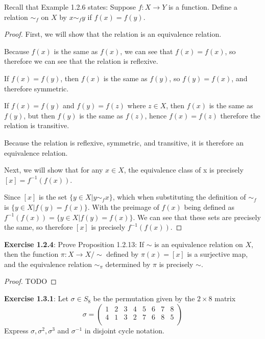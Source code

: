 \documentclass[a4paper]{article}
\begin{document}
\begin{myparindent}{0pt}
Recall that Example 1.2.6 states: Suppose $f : X \rightarrow Y$ is a function.
Define a relation $\sim_f$ on $X$ by $x \sim_f y$ if $f(x) = f(y)$.

\begin{proof}
    First, we will show that the relation is an equivalence relation. \newline

    Because $f(x)$ is the same as $f(x)$, we can see that $f(x) = f(x)$,
    so therefore we can see that the relation is reflexive. \newline

    If $f(x) = f(y)$, then $f(x)$ is the same as $f(y)$, so $f(y) = f(x)$,
    and therefore symmetric. \newline

    If $f(x) = f(y)$ and $f(y) = f(z)$ where $z \in X$, then $f(x)$ is
    the same as $f(y)$, but then $f(y)$ is the same as $f(z)$, hence $f(x) = f(z)$
    therefore the relation is transitive. \newline

    Because the relation is reflexive, symmetric, and transitive, it
    is therefore an equivalence relation. \newline

    Next, we will show that for any $x \in X$, the equivalence class of x is
    precisely $[x] = f^{-1}(f(x))$. \newline

    Since $[x]$ is the set $\{y \in X | y \sim_f x\}$, which when substituting
    the definition of $\sim_f$ is $\{y \in X | f(y) = f(x)\}$. With the preimage
    of $f(x)$ being defined as $f^{-1}(f(x)) = \{ y \in X | f(y) = f(x) \}$.
    We can see that these sets are precisely the same, so therefore $[x]$ is
    precisely $f^{-1}(f(x))$.
\end{proof}

\textbf{Exercise 1.2.4}:
Prove Proposition 1.2.13: If $\sim$ is an equivalence relation on $X$, then the function $\pi: X \rightarrow X/\sim$
defined by $\pi(x) = [x]$ is a surjective map, and the equivalence relation $\sim_{\pi}$ determined by $\pi$ is
precisely $\sim$. \newline

\begin{proof}
TODO \newline
\end{proof}

\textbf{Exercise 1.3.1}:
Let $\sigma \in S_8$ be the permutation given by the $2 \times 8$ matrix \newline
\[
  \sigma =
  \begin{pmatrix}
    1 & 2 & 3 & 4 & 5 & 6 & 7 & 8 \\
    4 & 1 & 3 & 2 & 7 & 6 & 8 & 5 \\
  \end{pmatrix}
\]
Express $\sigma, \sigma^2, \sigma^3$ and $\sigma^{-1}$ in disjoint cycle notation. \newline


\end{myparindent}
\end{document}
